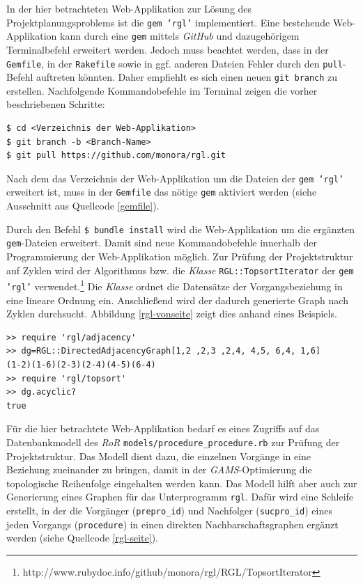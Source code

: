 \documentclass[a4paper,12pt,parskip,bibtotoc,liststotoc]{article}
\begin{document}
In der hier betrachteten Web-Applikation zur Lösung des Projektplanungsproblems ist die \texttt{gem 'rgl'} implementiert. Eine bestehende Web-Applikation kann durch eine \texttt{gem} mittels \textit{GitHub} und dazugehörigem Terminalbefehl erweitert werden. Jedoch muss beachtet werden, dass in der \texttt{Gemfile}, in der \texttt{Rakefile} sowie in ggf. anderen Dateien Fehler durch den \texttt{pull}-Befehl auftreten könnten. Daher empfiehlt es sich einen neuen \texttt{git branch} zu erstellen. Nachfolgende Kommandobefehle im Terminal zeigen die vorher beschriebenen Schritte:  
\begin{lstlisting}[style=Befehl]
$ cd <Verzeichnis der Web-Applikation>
$ git branch -b <Branch-Name>
$ git pull https://github.com/monora/rgl.git
\end{lstlisting}

Nach dem das Verzeichnis der Web-Applikation um die Dateien der \texttt{gem 'rgl'} erweitert ist, muss in der \texttt{Gemfile} das nötige \texttt{gem} aktiviert werden (siehe Ausschnitt aus Quellcode \ref{gemfile}).



Durch den Befehl \texttt{\$ bundle install} wird die Web-Applikation um die ergänzten \texttt{gem}-Dateien erweitert. Damit sind neue Kommandobefehle innerhalb der Programmierung der Web-Applikation möglich. Zur Prüfung der Projektstruktur auf Zyklen wird der Algorithmus bzw. die \textit{Klasse} \texttt{RGL::TopsortIterator} der \texttt{gem 'rgl'} verwendet.\footnote{http://www.rubydoc.info/github/monora/rgl/RGL/TopsortIterator} Die \textit{Klasse} ordnet die Datensätze der Vorgangsbeziehung in eine lineare Ordnung ein. Anschließend wird der dadurch generierte Graph nach Zyklen durchsucht. Abbildung \ref{rgl-vonseite} zeigt dies anhand eines Beispiels.
\begin{lstlisting}[caption=Prüfung auf Zyklen mittels des Unterprogramms \glqq rgl\grqq, style=Listing, label=rgl-vonseite]
>> require 'rgl/adjacency'
>> dg=RGL::DirectedAdjacencyGraph[1,2 ,2,3 ,2,4, 4,5, 6,4, 1,6]
(1-2)(1-6)(2-3)(2-4)(4-5)(6-4)
>> require 'rgl/topsort'
>> dg.acyclic?
true
\end{lstlisting}

Für die hier betrachtete Web-Applikation bedarf es eines Zugriffs auf das Datenbankmodell des \textit{RoR} \texttt{models/procedure\_procedure.rb} zur Prüfung der Projektstruktur. Das Modell dient dazu, die einzelnen Vorgänge in eine Beziehung zueinander zu bringen, damit in der \textit{GAMS}-Optimierung die topologische Reihenfolge eingehalten werden kann. Das Modell hilft aber auch zur Generierung eines Graphen für das Unterprogramm \texttt{rgl}. Dafür wird eine Schleife erstellt, in der die Vorgänger (\texttt{prepro\_id}) und Nachfolger (\texttt{sucpro\_id}) eines jeden Vorgangs (\texttt{procedure}) in einen direkten Nachbarschaftsgraphen ergänzt werden (siehe Quellcode \ref{rgl-seite}).
\end{document}
